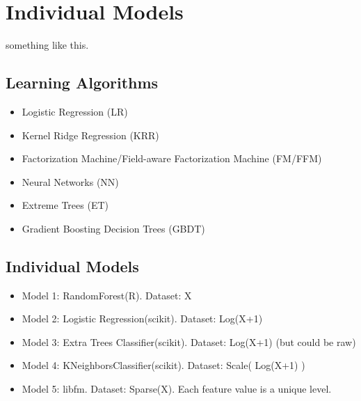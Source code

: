 \section{Individual Models}
something like this.

\subsection{Learning Algorithms}
\begin{itemize}
\item Logistic Regression (LR)
\item Kernel Ridge Regression (KRR)
\item Factorization Machine/Field-aware Factorization Machine (FM/FFM)
\item Neural Networks (NN)
\item Extreme Trees (ET)
\item Gradient Boosting Decision Trees (GBDT)
\end{itemize}

\subsection{Individual Models}
\begin{itemize}
  \item Model 1: RandomForest(R). Dataset: X
  \item Model 2: Logistic Regression(scikit). Dataset: Log(X+1)
  \item Model 3: Extra Trees Classifier(scikit). Dataset: Log(X+1) (but could be raw)
  \item Model 4: KNeighborsClassifier(scikit). Dataset: Scale( Log(X+1) )
  \item Model 5: libfm. Dataset: Sparse(X). Each feature value is a unique level.
\end{itemize}
